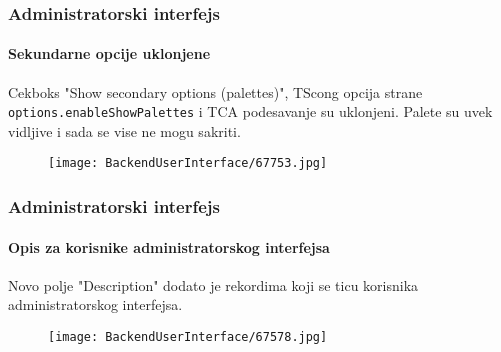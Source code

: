 \begin{frame}[fragile]
	\frametitle{Administratorski interfejs}
	\framesubtitle{Sekundarne opcije uklonjene}

	Cekboks "Show secondary options (palettes)", TScong opcija strane \texttt{options.enableShowPalettes} i TCA podesavanje su uklonjeni. Palete su uvek vidljive i sada se vise ne mogu sakriti.

	\begin{figure}
		\texttt{[image: BackendUserInterface/67753.jpg]}
	\end{figure}

\end{frame}

\begin{frame}[fragile]
	\frametitle{Administratorski interfejs}
	\framesubtitle{Opis za korisnike administratorskog interfejsa}

	Novo polje "Description" dodato je rekordima koji se ticu korisnika administratorskog interfejsa.

	\begin{figure}
		\texttt{[image: BackendUserInterface/67578.jpg]}
	\end{figure}

\end{frame}

